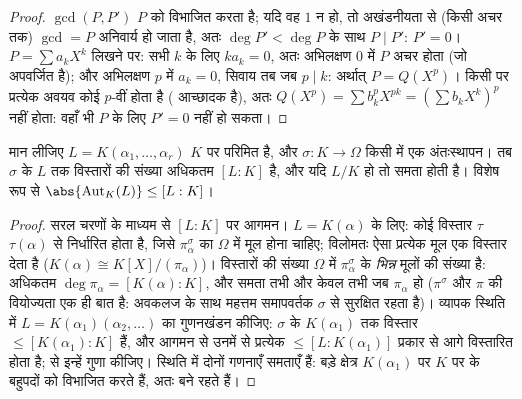 \begin{proof}
$\gcd(P, P')$ $P$ को विभाजित करता है; यदि वह $1$ न हो, तो अखंडनीयता
से (किसी अचर तक) $\gcd = P$ अनिवार्य हो जाता है, अतः $\deg
P' < \deg P$ के साथ
$P \mid P'$: $P' = 0$। $P = \sum a_kX^k$ लिखने पर: सभी $k$ के लिए $ka_k = 0$, अतः
अभिलक्षण $0$ में $P$ अचर होता (जो अपवर्जित है); और अभिलक्षण
$p$ में $a_k = 0$, सिवाय तब जब $p \mid k$: अर्थात् $P =
Q(X^p)$। किसी  पर प्रत्येक अवयव कोई $p$-वीं  होता है (
आच्छादक है), अतः $Q(X^p) = \sum b_k^p X^{pk} = (\sum
b_kX^k)^p$  नहीं होता: वहाँ भी  $P$
के लिए $P' = 0$ नहीं हो सकता।
\end{proof}

\begin{proposition}[अंतःस्थापनों की गणना]\label{prop:b3:galois:embeddings}
मान लीजिए $L = K(\alpha_1, \dots, \alpha_r)$ $K$ पर परिमित है, और $\sigma \colon K \to \Omega$ किसी  में एक अंतःस्थापन। तब $\sigma$ के $L$ तक विस्तारों
की संख्या अधिकतम $[L:K]$ है, और यदि $L/K$  हो तो समता होती
है। विशेष रूप से $\abs{\operatorname{Aut}_K(L)} \leq [L:K]$।
\end{proposition}

\begin{proof}
सरल चरणों के माध्यम से $[L:K]$ पर आगमन। $L = K(\alpha)$ के लिए: कोई विस्तार
$\tau$ $\tau(\alpha)$ से निर्धारित होता है, जिसे $\pi_\alpha^\sigma$ का $\Omega$ में मूल
होना चाहिए; विलोमतः ऐसा प्रत्येक मूल एक विस्तार देता है ($K(\alpha) \cong K[X]/(\pi_\alpha)$)।
विस्तारों की संख्या $\Omega$ में $\pi_\alpha^\sigma$ के \emph{भिन्न} मूलों की
संख्या है: अधिकतम $\deg\pi_\alpha =
[K(\alpha):K]$, और समता तभी और केवल तभी जब $\pi_\alpha$
 हो ($\pi^\sigma$ और $\pi$ की वियोज्यता एक ही बात है: अवकलज के
साथ महत्तम समापवर्तक $\sigma$ से सुरक्षित रहता है)। व्यापक स्थिति
में $L =
K(\alpha_1)(\alpha_2, \dots)$ का गुणनखंडन कीजिए: $\sigma$ के $K(\alpha_1)$ तक विस्तार $\leq [K(\alpha_1):K]$
हैं, और आगमन से उनमें से प्रत्येक $\leq [L : K(\alpha_1)]$ प्रकार से आगे विस्तारित
होता है;  से इन्हें गुणा कीजिए।  स्थिति में
दोनों गणनाएँ समताएँ हैं: बड़े क्षेत्र $K(\alpha_1)$ पर 
$K$ पर के बहुपदों को विभाजित करते हैं, अतः  बने रहते
हैं।
\end{proof}

